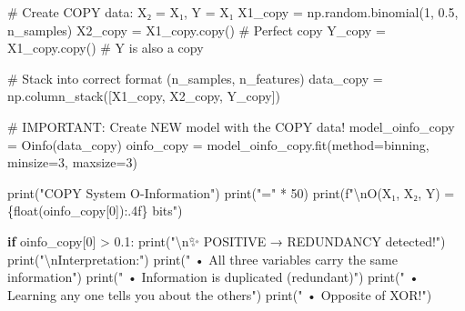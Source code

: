 \documentclass[
  11pt,
  letterpaper,
  oneside,
  openany]{book}
\newenvironment{Shaded}{\begin{snugshade}}{\end{snugshade}}
\newcommand{\BuiltInTok}[1]{\textcolor[rgb]{0.00,0.23,0.31}{#1}}
\newcommand{\CharTok}[1]{\textcolor[rgb]{0.13,0.47,0.30}{#1}}
\newcommand{\CommentTok}[1]{\textcolor[rgb]{0.37,0.37,0.37}{#1}}
\newcommand{\ControlFlowTok}[1]{\textcolor[rgb]{0.00,0.23,0.31}{\textbf{#1}}}
\newcommand{\DecValTok}[1]{\textcolor[rgb]{0.68,0.00,0.00}{#1}}
\newcommand{\FloatTok}[1]{\textcolor[rgb]{0.68,0.00,0.00}{#1}}
\newcommand{\NormalTok}[1]{\textcolor[rgb]{0.00,0.23,0.31}{#1}}
\newcommand{\OperatorTok}[1]{\textcolor[rgb]{0.37,0.37,0.37}{#1}}
\newcommand{\SpecialCharTok}[1]{\textcolor[rgb]{0.37,0.37,0.37}{#1}}
\newcommand{\SpecialStringTok}[1]{\textcolor[rgb]{0.13,0.47,0.30}{#1}}
\newcommand{\StringTok}[1]{\textcolor[rgb]{0.13,0.47,0.30}{#1}}
\begin{document}
\begin{Shaded}
\begin{Highlighting}[]
\CommentTok{\# Create COPY data: X₂ = X₁, Y = X₁}
\NormalTok{X1\_copy }\OperatorTok{=}\NormalTok{ np.random.binomial(}\DecValTok{1}\NormalTok{, }\FloatTok{0.5}\NormalTok{, n\_samples)}
\NormalTok{X2\_copy }\OperatorTok{=}\NormalTok{ X1\_copy.copy()  }\CommentTok{\# Perfect copy}
\NormalTok{Y\_copy }\OperatorTok{=}\NormalTok{ X1\_copy.copy()   }\CommentTok{\# Y is also a copy}

\CommentTok{\# Stack into correct format (n\_samples, n\_features)}
\NormalTok{data\_copy }\OperatorTok{=}\NormalTok{ np.column\_stack([X1\_copy, X2\_copy, Y\_copy])}

\CommentTok{\# IMPORTANT: Create NEW model with the COPY data!}
\NormalTok{model\_oinfo\_copy }\OperatorTok{=}\NormalTok{ Oinfo(data\_copy)}
\NormalTok{oinfo\_copy }\OperatorTok{=}\NormalTok{ model\_oinfo\_copy.fit(method}\OperatorTok{=}\StringTok{\textquotesingle{}binning\textquotesingle{}}\NormalTok{, minsize}\OperatorTok{=}\DecValTok{3}\NormalTok{, maxsize}\OperatorTok{=}\DecValTok{3}\NormalTok{)}

\BuiltInTok{print}\NormalTok{(}\StringTok{"COPY System O{-}Information"}\NormalTok{)}
\BuiltInTok{print}\NormalTok{(}\StringTok{"="} \OperatorTok{*} \DecValTok{50}\NormalTok{)}
\BuiltInTok{print}\NormalTok{(}\SpecialStringTok{f"}\CharTok{\textbackslash{}n}\SpecialStringTok{O(X₁, X₂, Y) = }\SpecialCharTok{\{}\BuiltInTok{float}\NormalTok{(oinfo\_copy[}\DecValTok{0}\NormalTok{])}\SpecialCharTok{:.4f\}}\SpecialStringTok{ bits"}\NormalTok{)}

\ControlFlowTok{if}\NormalTok{ oinfo\_copy[}\DecValTok{0}\NormalTok{] }\OperatorTok{\textgreater{}} \FloatTok{0.1}\NormalTok{:}
    \BuiltInTok{print}\NormalTok{(}\StringTok{"}\CharTok{\textbackslash{}n}\StringTok{✨ POSITIVE → REDUNDANCY detected!"}\NormalTok{)}
    \BuiltInTok{print}\NormalTok{(}\StringTok{"}\CharTok{\textbackslash{}n}\StringTok{Interpretation:"}\NormalTok{)}
    \BuiltInTok{print}\NormalTok{(}\StringTok{"  • All three variables carry the same information"}\NormalTok{)}
    \BuiltInTok{print}\NormalTok{(}\StringTok{"  • Information is duplicated (redundant)"}\NormalTok{)}
    \BuiltInTok{print}\NormalTok{(}\StringTok{"  • Learning any one tells you about the others"}\NormalTok{)}
    \BuiltInTok{print}\NormalTok{(}\StringTok{"  • Opposite of XOR!"}\NormalTok{)}


\end{Highlighting}
\end{Shaded}
\end{document}
